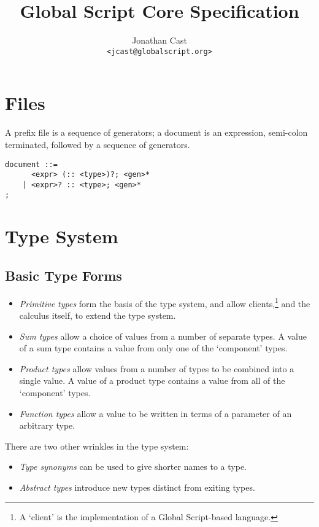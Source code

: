 \documentclass{report}
\title{Global Script Core Specification}
\author{Jonathan Cast\\\texttt{<jcast@globalscript.org>}}
\newcommand\defn[1]{\emph{#1}}
\begin{document}
\maketitle

\tableofcontents

\chapter{Files}

A prefix file is a sequence of generators; a document is an expression, semi-colon terminated, followed by a sequence of generators.

\begin{verbatim}
document ::=
      <expr> (:: <type>)?; <gen>*
    | <expr>? :: <type>; <gen>*
;
\end{verbatim}

\chapter{Type System}

\section{Basic Type Forms}

\begin{itemize}
    \item \defn{Primitive types} form the basis of the type system, and
    allow clients,\footnote{A `client' is the implementation of a Global Script-based language.}
    and the calculus itself,
    to extend the type system.

    \item \defn{Sum types} allow a choice of values from a number of separate types.
        A value of a sum type contains a value from only one of the `component' types.

    \item \defn{Product types} allow values from a number of types to be combined into a single value.
        A value of a product type contains a value from all of the `component' types.

    \item \defn{Function types} allow a value to be written in terms of a parameter of an arbitrary type.
\end{itemize}

There are two other wrinkles in the type system:
\begin{itemize}
    \item \defn{Type synonyms} can be used to give shorter names to a type.

    \item \defn{Abstract types} introduce new types distinct from exiting types.
\end{itemize}
\end{document}
